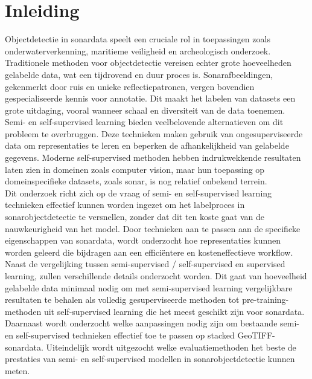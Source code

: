 
\section{Inleiding}%
\label{sec:inleiding}

Objectdetectie in sonardata speelt een cruciale rol in toepassingen zoals onderwaterverkenning, maritieme veiligheid en archeologisch onderzoek. Traditionele methoden voor objectdetectie vereisen echter grote hoeveelheden gelabelde data, wat een tijdrovend en duur proces is. Sonarafbeeldingen, gekenmerkt door ruis en unieke reflectiepatronen, vergen bovendien gespecialiseerde kennis voor annotatie. Dit maakt het labelen van datasets een grote uitdaging, vooral wanneer schaal en diversiteit van de data toenemen. \\

Semi- en self-supervised learning bieden veelbelovende alternatieven om dit probleem te overbruggen. Deze technieken maken gebruik van ongesuperviseerde data om representaties te leren en beperken de afhankelijkheid van gelabelde gegevens. Moderne self-supervised methoden hebben indrukwekkende resultaten laten zien in domeinen zoals computer vision, maar hun toepassing op domeinspecifieke datasets, zoals sonar, is nog relatief onbekend terrein. \\

Dit onderzoek richt zich op de vraag of semi- en self-supervised learning technieken effectief kunnen worden ingezet om het labelproces in sonarobjectdetectie te versnellen, zonder dat dit ten koste gaat van de nauwkeurigheid van het model. Door technieken aan te passen aan de specifieke eigenschappen van sonardata, wordt onderzocht hoe representaties kunnen worden geleerd die bijdragen aan een efficiëntere en kosteneffectieve workflow. \\

Naast de vergelijking tussen semi-supervised / self-supervised en supervised learning, zullen verschillende details onderzocht worden. Dit gaat van hoeveelheid gelabelde data minimaal nodig om met semi-supervised learning vergelijkbare resultaten te behalen als volledig gesuperviseerde methoden tot pre-training-methoden uit self-supervised learning die het meest geschikt zijn voor sonardata. Daarnaast wordt onderzocht welke aanpassingen nodig zijn om bestaande semi- en self-supervised technieken effectief toe te passen op stacked GeoTIFF-sonardata. Uiteindelijk wordt uitgezocht welke evaluatiemethoden het beste de prestaties van semi- en self-supervised modellen in sonarobjectdetectie kunnen meten.

